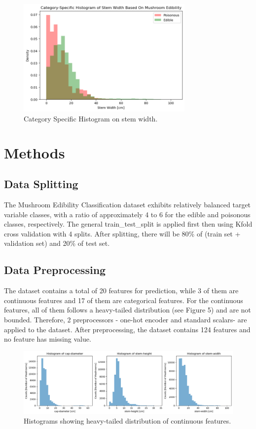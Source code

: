 \documentclass{article}
\begin{document}
\begin{figure}[h]
\centering
\includegraphics[width=0.77\textwidth]{eda3.png}
\caption{\label{fig:histogram} Category Specific Histogram on stem width.}
\end{figure}


\section{Methods}

\subsection{Data Splitting}

\hspace{0.5cm} The Mushroom Edibility Classification dataset exhibits relatively balanced target variable classes, with a ratio of approximately 4 to 6 for the edible and poisonous classes, respectively. The general train\_test\_split is applied first then using Kfold cross validation with 4 splits. After splitting, there will be 80\% of (train set + validation set) and 20\% of test set.

\subsection{Data Preprocessing}
\hspace{0.5cm} The dataset contains a total of 20 features for prediction, while 3 of them are continuous features and 17 of them are categorical features. For the continuous features, all of them follows a heavy-tailed distribution (see Figure 5) and are not bounded. Therefore, 2 preprocessors - one-hot encoder and standard scalars- are applied to the dataset. After preprocessing, the dataset contains 124 features and no feature has missing value.

\begin{figure}[h]
\centering
\includegraphics[width=1\textwidth]{hist1.png}
\caption{\label{fig:frog} Histograms showing heavy-tailed distribution of continuous features.}
\end{figure}
\end{document}
